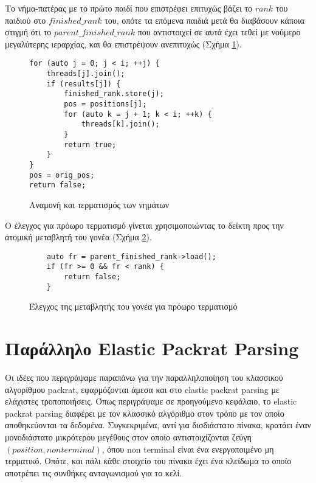 Το νήμα-πατέρας με το πρώτο παιδί που επιστρέφει επιτυχώς βάζει το $rank$ του παιδιού στο $finished\_rank$ του, οπότε τα επόμενα παιδιά μετά θα διαβάσουν κάποια στιγμή ότι το $parent\_finished\_rank$ που αντιστοιχεί σε αυτά  έχει τεθεί με νούμερο μεγαλύτερης ιεραρχίας, και θα επιστρέψουν ανεπιτυχώς (Σχήμα \ref{fig:rec_top_down_join}).

\begin{figure}[h]
\setlength\partopsep{-\topsep}%
\begin{verbatim}
for (auto j = 0; j < i; ++j) {
    threads[j].join();
    if (results[j]) {
        finished_rank.store(j);
        pos = positions[j];
        for (auto k = j + 1; k < i; ++k) {
            threads[k].join();
        }
        return true;
    }
}
pos = orig_pos;
return false;
\end{verbatim}
  \caption{Αναμονή και τερματισμός των νημάτων}
\label{fig:rec_top_down_join}
\end{figure}

Ο έλεγχος για πρόωρο τερματισμό γίνεται χρησιμοποιώντας το δείκτη προς την ατομική μεταβλητή του γονέα (Σχήμα \ref{fig:rec_top_down_stop}).

\begin{figure}[h]
\setlength\partopsep{-\topsep}%
\begin{verbatim}
    auto fr = parent_finished_rank->load();
    if (fr >= 0 && fr < rank) { 
        return false;
    }
\end{verbatim}
\caption{Έλεγχος της μεταβλητής του γονέα για πρόωρο τερματισμό}
  \label{fig:rec_top_down_stop}
\end{figure}


\section{Παράλληλο Elastic Packrat Parsing}
Οι ιδέες που περιγράψαμε παραπάνω για την παραλληλοποίηση του κλασσικού αλγορίθμου packrat, εφαρμόζονται άμεσα και στο elastic packrat parsing με ελάχιστες τροποποιήσεις.
Όπως περιγράψαμε σε προηγούμενο κεφάλαιο, το elastic packrat parsing διαφέρει με τον κλασσικό αλγόριθμο στον τρόπο με τον οποίο αποθηκεύονται τα δεδομένα.
Συγκεκριμένα, αντί για δισδιάστατο πίνακα, κρατάει έναν μονοδιάστατο μικρότερου μεγέθους στον οποίο αντιστοιχίζονται ζεύγη $(position, non terminal)$, όπου non terminal είναι ένα ενεργοποιμένο μη τερματικό.
Οπότε, και πάλι κάθε στοιχείο του πίνακα έχει ένα κλείδωμα το οποίο αποτρέπει τις συνθήκες ανταγωνισμού για το κελί.

